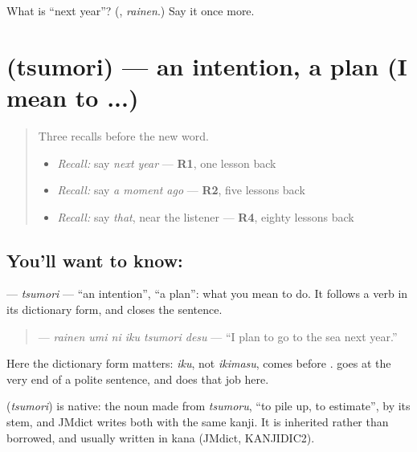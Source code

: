 \begin{tcolorbox}[breakable,colback=teal!4,colframe=teal!35!black,title={Before you move on}]
What is \textquotedblleft{}next year\textquotedblright{}? (\textbf{}, \emph{rainen}.) Say it once more.
\end{tcolorbox}
\section[\texorpdfstring{\ja{つもり} (tsumori)}{つもり (tsumori)}]{ (tsumori) — an intention, a plan (I mean to ...)}

\label{lesson:JA-C141-tsumori}



\begin{quote}
Three recalls before the new word.

\begin{itemize}
\raggedright
  \item \emph{Recall:} say \emph{next year} — \textbf{R1}, one lesson back
  \item \emph{Recall:} say \emph{a moment ago} — \textbf{R2}, five lessons back
  \item \emph{Recall:} say \emph{that}, near the listener — \textbf{R4}, eighty lessons back
\end{itemize}
\end{quote}

\subsection*{You'll want to know: }
\textbf{} — \emph{tsumori} — \textquotedblleft{}an intention\textquotedblright{}, \textquotedblleft{}a plan\textquotedblright{}: what you mean to do. It follows a verb in its dictionary form, and \textbf{} closes the sentence.

\begin{quote}
\textbf{   } — \emph{rainen umi ni iku tsumori desu} — \textquotedblleft{}I plan to go to the sea next year.\textquotedblright{}
\end{quote}

Here the dictionary form matters: \emph{iku}, not \emph{ikimasu}, comes before \textbf{}. \textbf{} goes at the very end of a polite sentence, and \textbf{} does that job here.

\begin{cousinweb}
\textbf{} (\emph{tsumori}) is native: the noun made from \emph{tsumoru}, \textquotedblleft{}to pile up, to estimate\textquotedblright{}, by its stem, and JMdict writes both with the same kanji. It is inherited rather than borrowed, and usually written in kana (JMdict, KANJIDIC2).
\end{cousinweb}

